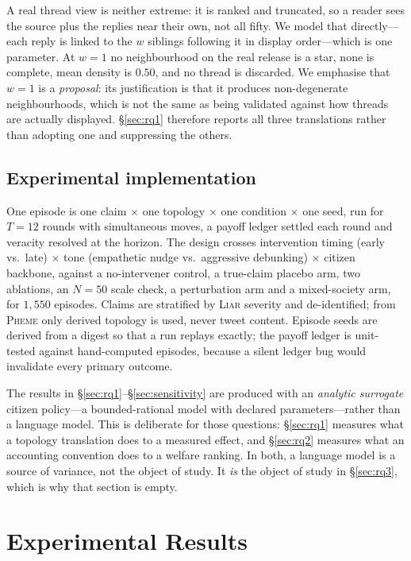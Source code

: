 \documentclass{article}
\begin{document}
A real thread view is neither extreme: it is ranked and truncated, so a reader
sees the source plus the replies near their own, not all fifty. We model that
directly---each reply is linked to the $w$ siblings following it in display
order---which is one parameter. At $w=1$ no neighbourhood on the real release is
a star, none is complete, mean density is $0.50$, and no thread is discarded.
We emphasise that $w=1$ is a \emph{proposal}: its justification is that it
produces non-degenerate neighbourhoods, which is not the same as being validated
against how threads are actually displayed. \S\ref{sec:rq1} therefore reports
all three translations rather than adopting one and suppressing the others.

\subsection{Experimental implementation}

One episode is one claim $\times$ one topology $\times$ one condition $\times$
one seed, run for $T = 12$ rounds with simultaneous moves, a payoff ledger
settled each round and veracity resolved at the horizon. The design crosses
intervention timing (early vs.\ late) $\times$ tone (empathetic nudge vs.\
aggressive debunking) $\times$ citizen backbone, against a no-intervener
control, a true-claim placebo arm, two ablations, an $N = 50$ scale check, a
perturbation arm and a mixed-society arm, for $1{,}550$ episodes. Claims are stratified by
\textsc{Liar} severity and de-identified; from \textsc{Pheme} only derived
topology is used, never tweet content. Episode seeds are derived from a digest
so that a run replays exactly; the payoff ledger is unit-tested against
hand-computed episodes, because a silent ledger bug would invalidate every
primary outcome.

The results in \S\ref{sec:rq1}--\S\ref{sec:sensitivity} are produced with an
\emph{analytic surrogate} citizen policy---a bounded-rational model with
declared parameters---rather than a language model. This is deliberate for those
questions: \S\ref{sec:rq1} measures what a topology translation does to a
measured effect, and \S\ref{sec:rq2} measures what an accounting convention does
to a welfare ranking. In both, a language model is a source of variance, not the
object of study. It \emph{is} the object of study in \S\ref{sec:rq3}, which is
why that section is empty.

\section{Experimental Results}
\end{document}
